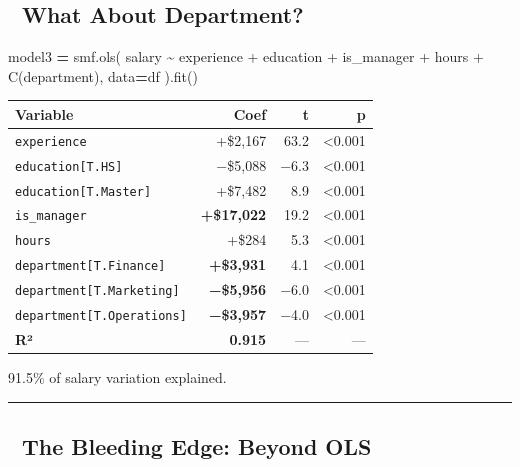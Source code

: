 \documentclass[
]{article}
\newenvironment{Shaded}{\begin{snugshade}}{\end{snugshade}}
\newcommand{\NormalTok}[1]{#1}
\newcommand{\OperatorTok}[1]{\textcolor[rgb]{0.81,0.36,0.00}{\textbf{#1}}}
\newcommand{\StringTok}[1]{\textcolor[rgb]{0.31,0.60,0.02}{#1}}
\begin{document}
\subsection{🏢 What About Department?}\label{what-about-department}

\begin{Shaded}
\begin{Highlighting}[]
\NormalTok{model3 }\OperatorTok{=}\NormalTok{ smf.ols(}
    \StringTok{\textquotesingle{}salary \textasciitilde{} experience + education + is\_manager + hours + C(department)\textquotesingle{}}\NormalTok{,}
\NormalTok{    data}\OperatorTok{=}\NormalTok{df}
\NormalTok{).fit()}
\end{Highlighting}
\end{Shaded}

\begin{longtable}[]{@{}lrrr@{}}
\toprule\noalign{}
Variable & Coef & t & p \\
\midrule\noalign{}
\endhead
\bottomrule\noalign{}
\endlastfoot
\texttt{experience} & +\$2,167 & 63.2 & \textless0.001 \\
\texttt{education{[}T.HS{]}} & −\$5,088 & −6.3 & \textless0.001 \\
\texttt{education{[}T.Master{]}} & +\$7,482 & 8.9 & \textless0.001 \\
\texttt{is\_manager} & \textbf{+\$17,022} & 19.2 & \textless0.001 \\
\texttt{hours} & +\$284 & 5.3 & \textless0.001 \\
\texttt{department{[}T.Finance{]}} & \textbf{+\$3,931} & 4.1 &
\textless0.001 \\
\texttt{department{[}T.Marketing{]}} & \textbf{−\$5,956} & −6.0 &
\textless0.001 \\
\texttt{department{[}T.Operations{]}} & \textbf{−\$3,957} & −4.0 &
\textless0.001 \\
\textbf{R²} & \textbf{0.915} & --- & --- \\
\end{longtable}

91.5\% of salary variation explained.

\begin{center}\rule{0.5\linewidth}{0.5pt}\end{center}

\subsection{🚀 The Bleeding Edge: Beyond
OLS}\label{the-bleeding-edge-beyond-ols}
\end{document}
